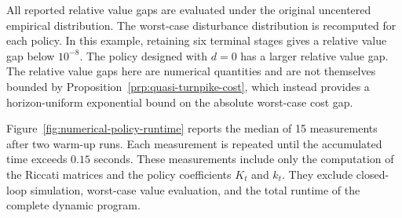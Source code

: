 \documentclass[10pt,journal,twoside]{IEEEtran}
\theoremstyle{definition}
\theoremstyle{remark}
\begin{document}
All reported relative value gaps are evaluated under the original uncentered
empirical distribution. The worst-case disturbance distribution is recomputed
for each policy. In this example, retaining six terminal stages gives a
relative value gap below \(10^{-8}\). The policy designed with \(d=0\) has a
larger relative value gap. The relative value gaps here are numerical quantities and are not themselves bounded by Proposition~\ref{prp:quasi-turnpike-cost}, which instead provides a horizon-uniform exponential bound on the absolute worst-case cost gap.

Figure~\ref{fig:numerical-policy-runtime} reports the median of 15
measurements after two warm-up runs. Each measurement is repeated until the
accumulated time exceeds \(0.15\) seconds. These measurements include only the
computation of the Riccati matrices and the policy coefficients \(K_t\) and
\(k_t\). They exclude closed-loop simulation, worst-case value evaluation,
and the total runtime of the complete dynamic program.








\end{document}
